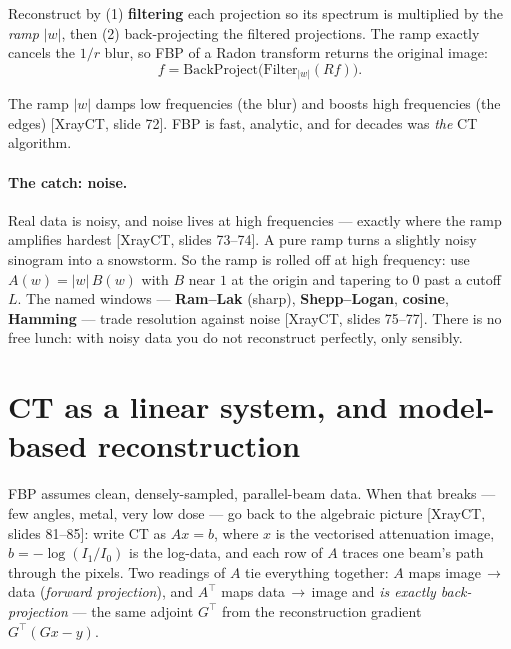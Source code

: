 \documentclass[11pt]{article}
\newcommand{\abs}[1]{\left\lvert #1 \right\rvert}
\newcommand{\deck}[1]{\textsf{\small[#1]}}
\begin{document}
\begin{keybox}
Reconstruct by (1) \textbf{filtering} each projection so its spectrum is
multiplied by the \emph{ramp} $\abs{w}$, then (2) back-projecting the filtered
projections. The ramp exactly cancels the $1/r$ blur, so FBP of a Radon
transform returns the original image:
\[
f = \text{BackProject}\big(\text{Filter}_{\abs{w}}(Rf)\big).
\]
\end{keybox}

The ramp $\abs{w}$ damps low frequencies (the blur) and boosts high frequencies
(the edges) \deck{XrayCT, slide 72}. FBP is fast, analytic, and for decades was
\emph{the} CT algorithm.

\paragraph{The catch: noise.} Real data is noisy, and noise lives at high
frequencies --- exactly where the ramp amplifies hardest \deck{XrayCT, slides
73--74}. A pure ramp turns a slightly noisy sinogram into a snowstorm. So the
ramp is rolled off at high frequency: use $A(w)=\abs{w}\,B(w)$ with $B$ near $1$
at the origin and tapering to $0$ past a cutoff $L$. The named windows ---
\textbf{Ram--Lak} (sharp), \textbf{Shepp--Logan}, \textbf{cosine},
\textbf{Hamming} --- trade resolution against noise \deck{XrayCT, slides 75--77}.
There is no free lunch: with noisy data you do not reconstruct perfectly, only
sensibly.

\section{CT as a linear system, and model-based reconstruction}

FBP assumes clean, densely-sampled, parallel-beam data. When that breaks ---
few angles, metal, very low dose --- go back to the algebraic picture
\deck{XrayCT, slides 81--85}: write CT as $Ax=b$, where $x$ is the vectorised
attenuation image, $b=-\log(I_1/I_0)$ is the log-data, and each row of $A$ traces
one beam's path through the pixels. Two readings of $A$ tie everything together:
$A$ maps image\,$\to$\,data (\emph{forward projection}), and $A^{\!\top}$ maps
data\,$\to$\,image and \emph{is exactly back-projection} --- the same adjoint
$G^{\!\top}$ from the reconstruction gradient $G^{\!\top}(Gx-y)$.
\end{document}
